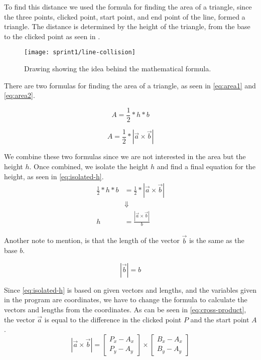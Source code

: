 To find this distance we used the formula for finding the area of a triangle, since the three points, clicked point, start point, and end point of the line, formed a triangle.
The distance is determined by the height of the triangle, from the base to the clicked point as seen in .
\begin{figure}[h]
	\centering
	\texttt{[image: sprint1/line-collision]}
	\caption{Drawing showing the idea behind the mathematical formula.}
	\label{figure:line-collision}
\end{figure}

There are two formulas for finding the area of a triangle, as seen in \eqref{eq:area1} and \eqref{eq:area2}.

\begin{equation}\label{eq:area1}
	A = \frac{1}{2}*h*b
\end{equation}

\begin{equation}\label{eq:area2}
	A =  \frac{1}{2}*|\vec{a} \times \vec{b}|
\end{equation}

We combine these two formulas since we are not interested in the area but the height $h$.
Once combined, we isolate the height $h$ and find a final equation for the height, as seen in \eqref{eq:isolated-h}.
\begin{equation}\label{eq:isolated-h}
\begin{aligned}
	\frac{1}{2}*h*b &=  \frac{1}{2}*|\vec{a} \times \vec{b}|\\
	& \Downarrow \\
	h &=  \frac{|\vec{a} \times \vec{b}|}{b}
\end{aligned}
\end{equation}

Another note to mention, is that the length of the vector $\vec{b}$ is the same as the base $b$.

\begin{equation*}
	|\vec{b}| = b
\end{equation*}

Since \eqref{eq:isolated-h} is based on given vectors and lengths, and the variables given in the program are coordinates, we have to change the formula to calculate the vectors and lengths from the coordinates.
As can be seen in \eqref{eq:cross-product}, the vector $\vec{a}$ is equal to the difference in the clicked point $P$ and the start point $A$.
\begin{equation}\label{eq:cross-product}
	|\vec{a} \times \vec{b}| = 
	\begin{bmatrix}
		P_x-A_x \\
		P_y-A_y
	\end{bmatrix}
	\times
	\begin{bmatrix}
		B_x-A_x \\
		B_y-A_y
	\end{bmatrix}
\end{equation}


